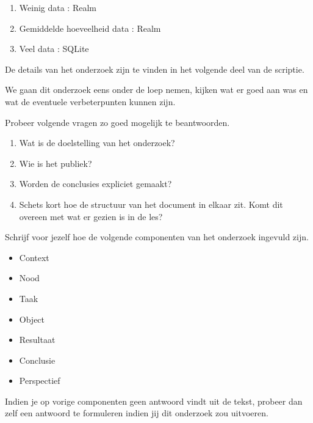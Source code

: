 \begin{displayquote}
  \begin{enumerate}
    \item Weinig data : Realm
    \item Gemiddelde hoeveelheid data : Realm
    \item Veel data : SQLite
  \end{enumerate}
  De details van het onderzoek zijn te vinden in het volgende deel van de scriptie.
\end{displayquote}

We gaan dit onderzoek eens onder de loep nemen, kijken wat er goed aan was en wat de eventuele verbeterpunten kunnen zijn. 

\begin{exercise}
  Probeer volgende vragen zo goed mogelijk te beantwoorden.
  \begin{enumerate}
    \item Wat is de doelstelling van het onderzoek?
    \item Wie is het publiek?
    \item Worden de conclusies expliciet gemaakt? 
    \item Schets kort hoe de structuur van het document in elkaar zit. Komt dit overeen met wat er gezien is in de les?
  \end{enumerate}
\end{exercise}

\begin{exercise}
  Schrijf voor jezelf hoe de volgende componenten van het onderzoek ingevuld zijn.
  \begin{itemize}
    \item Context
    \item Nood
    \item Taak
    \item Object
    \item Resultaat
    \item Conclusie
    \item Perspectief
  \end{itemize}
  
  Indien je op vorige componenten geen antwoord vindt uit de tekst, probeer dan zelf een antwoord te formuleren indien jij dit onderzoek zou uitvoeren. 
\end{exercise}

